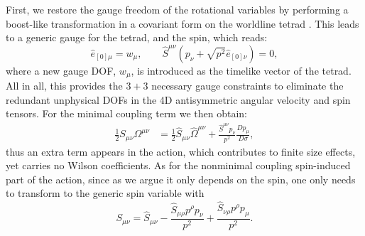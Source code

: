 \documentclass[a4paper,11pt]{article}
\begin{document}
First, we restore the gauge freedom of the rotational variables by performing a boost-like 
transformation in a covariant form on the worldline tetrad \cite{Levi:2015msa}. This 
leads to a generic gauge for the tetrad, and the spin, which reads:
\begin{equation}\label{gengauge+SSC}
\hat{e}_{[0]\mu} = w_{\mu}, \qquad
\hat{S}^{\mu\nu} \left( p_{\nu} + \sqrt{p^2} \hat{e}_{[0]\nu} \right) = 0,
\end{equation}
where a new gauge DOF, $w_{\mu}$, is introduced as the timelike vector of the tetrad. All in 
all, this provides the $3+3$ necessary gauge constraints to eliminate the redundant 
unphysical DOFs in the 4D antisymmetric angular velocity and spin tensors. For the minimal 
coupling term we then obtain:
\begin{align}\label{mcTrans}
\frac{1}{2} S_{\mu\nu} \Omega^{\mu\nu} &= 
  \frac{1}{2} \hat{S}_{\mu\nu} \hat{\Omega}^{\mu\nu}
	+ \frac{\hat{S}^{\mu\nu} p_{\nu}}{p^2} \frac{D p_{\mu}}{D \sigma},
\end{align}
thus an extra term appears in the action, which contributes to finite size effects, yet 
carries no Wilson coefficients. As for the nonminimal coupling spin-induced part of the 
action, since as we argue it only depends on the spin, one only needs to transform to the 
generic spin variable with 
\begin{equation}\label{Strans}
S_{\mu\nu} = \hat{S}_{\mu\nu} - \frac{\hat{S}_{\mu\rho} p^{\rho} p_{\nu}}{p^2}
	+ \frac{\hat{S}_{\nu\rho} p^{\rho} p_{\mu}}{p^2}.
\end{equation} 
\end{document}
